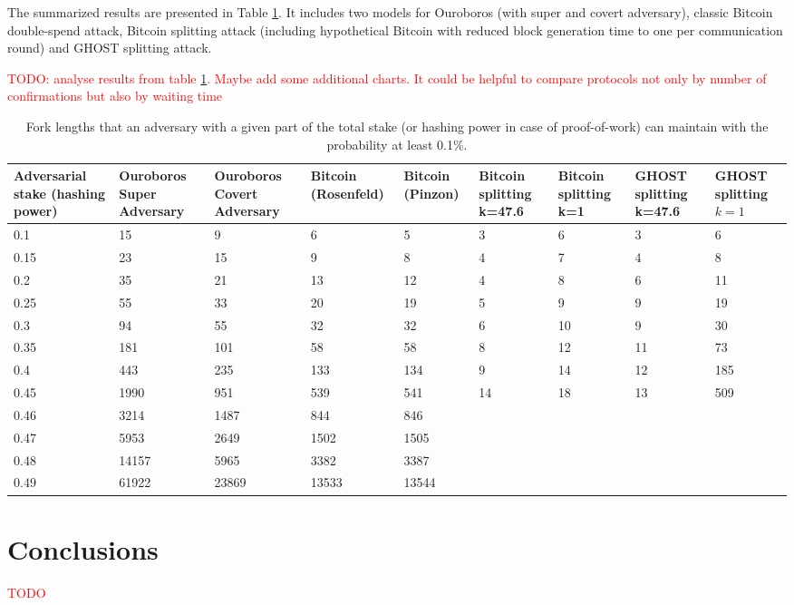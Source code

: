 \documentclass[10pt,a4paper]{article}
\newcommand\myworries[1]{\textcolor{red}{#1}}
\numberwithin{equation}{section} %
\theoremstyle{plain}
\theoremstyle{definition}
\theoremstyle{remark}
\begin{document}
	The summarized results are presented in Table \ref{tbl:fork_lengths_comparison}. It includes two models for Ouroboros (with super and covert adversary), classic Bitcoin double-spend attack, Bitcoin splitting attack (including hypothetical Bitcoin with reduced block generation time to one per communication round) and GHOST splitting attack.
	
	\myworries{TODO: analyse results from table \ref{tbl:fork_lengths_comparison}. Maybe add some additional charts. It could be helpful to compare protocols not only by number of confirmations but also by waiting time}
	
	\begin{table}[h!]
        \label{tbl:fork_lengths_comparison}
        \centering
    \begin{tabular}{|p{1.6cm}||p{1.5cm}|p{1.5cm}|p{1cm}|p{1cm}|p{1cm}|p{1cm}|p{1.2cm}|p{1.2cm}|}
         \hline 
         Adversarial stake (hashing power) & Ouroboros Super Adversary & Ouroboros Covert Adversary & Bitcoin (Rosenfeld) & Bitcoin (Pinzon) & Bitcoin splitting k=47.6 & Bitcoin splitting k=1 & GHOST splitting k=47.6 & GHOST splitting \(k=1\) \\
         \hline
         0.1   & 15     & 9     & 6     & 5     & 3  & 6  & 3   & 6     \\
         0.15  & 23     & 15    & 9     & 8     & 4  & 7  & 4   & 8     \\
         0.2   & 35     & 21    & 13    & 12    & 4  & 8  & 6   & 11    \\
         0.25  & 55     & 33    & 20    & 19    & 5  & 9  & 9   & 19    \\
         0.3   & 94     & 55    & 32    & 32    & 6  & 10 & 9   & 30    \\
         0.35  & 181    & 101   & 58    & 58    & 8  & 12 & 11  & 73    \\
         0.4   & 443    & 235   & 133   & 134   & 9  & 14 & 12  & 185   \\
         0.45  & 1990   & 951   & 539   & 541   & 14 & 18 & 13  & 509   \\
         0.46  & 3214   & 1487  & 844   & 846   &    &    &     &       \\
         0.47  & 5953   & 2649  & 1502  & 1505  &    &    &     &       \\
         0.48  & 14157  & 5965  & 3382  & 3387  &    &    &     &       \\
         0.49  & 61922  & 23869 & 13533 & 13544 &    &    &     &       \\
         \hline
    \end{tabular}
    \caption{Fork lengths that an adversary with a given part of the total stake (or hashing power in case of proof-of-work) can maintain with the probability at least 0.1\%.}
    \end{table}
	
	\section{Conclusions}
	
	\myworries{TODO}
	
    \printbibliography
	
\end{document}
